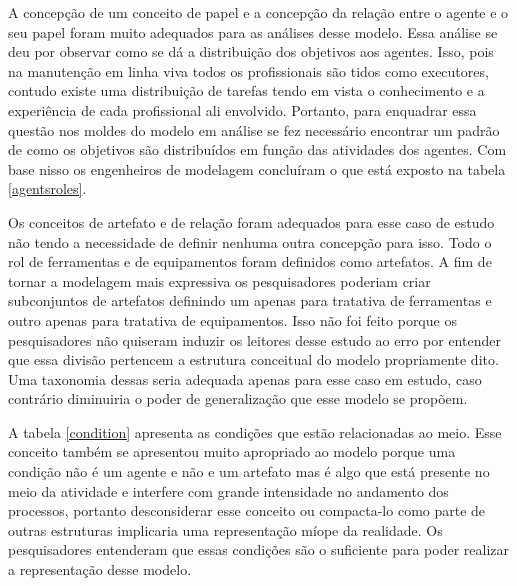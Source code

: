 A concepção de um conceito de papel e a concepção da relação entre o agente e o seu papel foram muito adequados para as análises desse modelo. Essa análise se deu por observar como se dá 
a distribuição dos objetivos aos agentes. Isso, pois na manutenção em linha viva todos os profissionais são tidos como executores, contudo existe uma distribuição de tarefas tendo em vista 
o conhecimento e a experiência de cada profissional ali envolvido. Portanto, para enquadrar essa questão nos moldes do modelo em análise se fez necessário encontrar um padrão de como os objetivos 
são distribuídos em função das atividades dos agentes. Com base nisso os engenheiros de modelagem concluíram o que está exposto na tabela \ref{agentsroles}.

Os conceitos de artefato e de relação foram adequados para esse caso de estudo não tendo a necessidade de definir nenhuma outra concepção para isso. Todo o rol de ferramentas e de equipamentos 
foram definidos como artefatos. A fim de tornar a modelagem mais expressiva os pesquisadores poderiam criar subconjuntos de artefatos definindo um apenas para tratativa de ferramentas e outro 
apenas para tratativa de equipamentos. Isso não foi feito porque os pesquisadores não quiseram induzir os leitores desse estudo ao erro por entender que essa divisão pertencem a estrutura conceitual 
do modelo propriamente dito. Uma taxonomia dessas seria adequada apenas para esse caso em estudo, caso contrário diminuiria o poder de generalização que esse modelo se propõem. 

A tabela \ref{condition} apresenta as condições que estão relacionadas ao meio. Esse conceito também se apresentou muito apropriado ao modelo porque uma condição não é um agente e não e um artefato 
mas é algo que está presente no meio da atividade e interfere com grande intensidade no andamento dos processos, portanto desconsiderar esse conceito ou compacta-lo como parte de outras estruturas 
implicaria uma representação míope da realidade. Os pesquisadores entenderam que essas condições são o suficiente para poder realizar a representação desse modelo.

